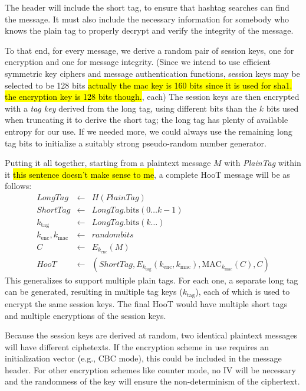 The header will include the short tag, to ensure that hashtag searches can find the message. It must also include the necessary information for somebody who knows the plain tag to properly decrypt and verify the integrity of the message. 

To that end, for every message, we derive a random pair of session keys, one for encryption and one for message integrity. (Since we intend to use efficient symmetric key ciphers and message authentication functions, session keys may be selected to be 128 bits \hl{actually the mac key is 160 bits since it is used for sha1. the encryption key is 128 bits though.}, each) The session keys are then encrypted with a {\em tag key} derived from the long tag, using different bits than the $k$ bits used when truncating it to derive the short tag; the long tag has plenty of available entropy for our use. If we needed more, we could always use the remaining long tag bits to initialize a suitably strong pseudo-random number generator.

Putting it all together, starting from a plaintext message $M$ with {\em PlainTag} within it \hl{this sentence doesn't make sense to me}, a complete HooT message will be as follows:
%
\begin{eqnarray*}
\mathit{LongTag} & \leftarrow & H(\mathit{PlainTag}) \\
\mathit{ShortTag} & \leftarrow & \mathit{LongTag}.\mathrm{bits}(0 \ldots k-1) \\
k_{\mathrm{tag}} & \leftarrow & \mathit{LongTag}.\mathrm{bits}(k \ldots) \\
k_{\mathrm{enc}}, k_{\mathrm{mac}} & \leftarrow & \mathit{random bits} \\
C & \leftarrow & E_{k_{\mathrm{enc}}}(M) \\
\mathit{HooT}  & \leftarrow &  \left(\mathit{ShortTag}, E_{k_{\mathrm{tag}}} \left(k_{\mathrm{enc}}, k_{\mathrm{mac}}\right), \mathrm{MAC}_{k_{\mathrm{mac}}}(C), C\right)
\end{eqnarray*}
%
This generalizes to support multiple plain tags. For each one, a separate long tag can be generated, resulting in multiple tag keys ($k_\mathrm{tag}$), each of which is used to encrypt the same session keys. The final HooT would have multiple short tags and multiple encryptions of the session keys.

Because the session keys are derived at random, two identical plaintext messages will have different ciphetexts. If the encryption scheme in use requires an initialization vector (e.g., CBC mode), this could be included in the message header. For other encryption schemes like counter mode, no IV will be necessary and the randomness of the key will ensure the non-determinism of the ciphertext.

